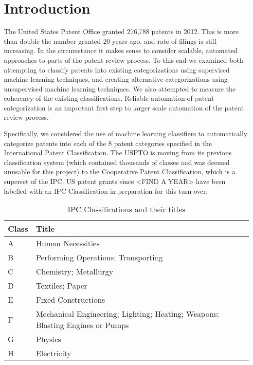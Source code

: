 \section{Introduction}
The United States Patent Office granted 276,788 patents in 2012\cite{USPTO:2013:stats}. This is more than double the number granted 20 years ago, and rate of filings is still increasing. In the circumstance it makes sense to consider scalable, automated approaches to parts of the patent review process. To this end we examined both attempting to classify patents into existing categorizations using supervised machine learning techniques, and creating alternative categorizations using unsupervised machine learning techniques. We also attempted to measure the coherency of the existing classifications. Reliable automation of patent categorization is an important first step to larger scale automation of the patent review process.



Specifically, we considered the use of machine learning classifiers to automatically categorize patents into each of the 8 patent categories specified in the International Patent Classification\cite{ipc:2013:guide}. The USPTO is moving from its previous classification system (which contained thousands of classes and was deemed unusable for this project) to the Cooperative Patent Classification, which is a superset of the IPC. US patent grants since <FIND A YEAR> have been labelled with an IPC Classification in preparation for this turn over.



\begin{table}[H]
	\centering
	\begin{tabular}{ | l | l |}
		\hline
		\textbf{Class} & \textbf{Title} \\
				\hline
		A & Human Necessities \\
				\hline
		B & Performing Operations; Transporting \\
				\hline
		C & Chemistry; Metallurgy \\
				\hline
		D & Textiles; Paper \\
				\hline
		E & Fixed Constructions \\
				\hline
		F & Mechanical Engineering; Lighting; Heating; Weapons; Blasting Engines or Pumps \\
		\hline
		G & Physics \\
				\hline
		H & Electricity \\
				\hline
	\end{tabular}
	\caption{IPC Classifications and their titles}
\end{table}



